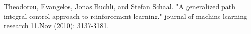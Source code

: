 \documentclass[journal]{IEEEtran}
\begin{document}






\ifCLASSOPTIONcaptionsoff
  \newpage
\fi





%
%
%
\begin{thebibliography}{1}

Theodorou, Evangelos, Jonas Buchli, and Stefan Schaal. "A generalized path integral control approach to reinforcement learning." journal of machine learning research 11.Nov (2010): 3137-3181.

\end{thebibliography}
\end{document}
